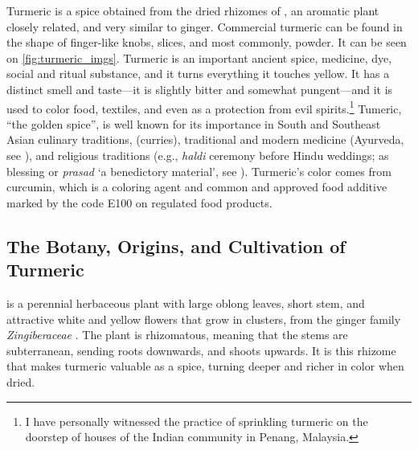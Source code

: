 Turmeric is a spice obtained from the dried rhizomes of , an aromatic plant closely related, and very similar to ginger. Commercial turmeric can be found in the shape of finger-like knobs, slices, and most commonly, powder. It can be seen on \cref{fig:turmeric_imgs}. Turmeric is an important ancient spice, medicine, dye, social and ritual substance, and it turns everything it touches yellow. It has a distinct smell and taste---it is slightly bitter and somewhat pungent---and it is used to color food, textiles, and even as a protection from evil spirits.\footnote{I have personally witnessed the practice of sprinkling turmeric on the doorstep of houses of the Indian community in Penang, Malaysia.} Tumeric, ``the golden spice'', is well known for its importance in South and Southeast Asian culinary traditions, (curries), traditional and modern medicine (\gls{Ayurveda}, see \textcite{prasad_turmeric_2011}), and religious traditions (e.g., \textit{haldi} ceremony before Hindu weddings; as blessing or \textit{prasad} `a benedictory material', see \textcite{nair_turmeric_2019}). Turmeric's color comes from curcumin, which is a coloring agent and common and approved food additive marked by the code E100 on regulated food products.

\subsection{The Botany, Origins, and Cultivation of Turmeric}



 is a perennial herbaceous plant with large oblong leaves, short stem, and attractive white and yellow flowers that grow in clusters, from the ginger family \textit{Zingiberaceae} \autocite[128]{van_wyk_culinary_2014}. The plant is rhizomatous, meaning that the stems are subterranean, sending roots downwards, and shoots upwards. It is this rhizome that makes turmeric valuable as a spice, turning deeper and richer in color when dried.

